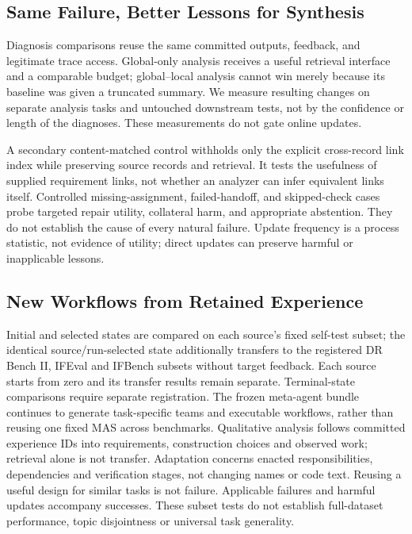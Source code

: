 \documentclass[11pt]{article}
\begin{document}
\subsection{Same Failure, Better Lessons for Synthesis}
\label{sec:repairtest}

Diagnosis comparisons reuse the same committed outputs, feedback, and legitimate trace access. Global-only analysis receives a useful retrieval interface and a comparable budget; global--local analysis cannot win merely because its baseline was given a truncated summary. We measure resulting changes on separate analysis tasks and untouched downstream tests, not by the confidence or length of the diagnoses. These measurements do not gate online updates.

A secondary content-matched control withholds only the explicit cross-record link index while preserving source records and retrieval. It tests the usefulness of supplied requirement links, not whether an analyzer can infer equivalent links itself. Controlled missing-assignment, failed-handoff, and skipped-check cases probe targeted repair utility, collateral harm, and appropriate abstention. They do not establish the cause of every natural failure. Update frequency is a process statistic, not evidence of utility; direct updates can preserve harmful or inapplicable lessons.

\subsection{New Workflows from Retained Experience}
\label{sec:transfer}

Initial and selected states are compared on each source's fixed self-test subset; the identical source/run-selected state additionally transfers to the registered DR Bench II, IFEval and IFBench subsets without target feedback. Each source starts from zero and its transfer results remain separate. Terminal-state comparisons require separate registration. The frozen meta-agent bundle continues to generate task-specific teams and executable workflows, rather than reusing one fixed MAS across benchmarks. Qualitative analysis follows committed experience IDs into requirements, construction choices and observed work; retrieval alone is not transfer. Adaptation concerns enacted responsibilities, dependencies and verification stages, not changing names or code text. Reusing a useful design for similar tasks is not failure. Applicable failures and harmful updates accompany successes. These subset tests do not establish full-dataset performance, topic disjointness or universal task generality.
\end{document}
